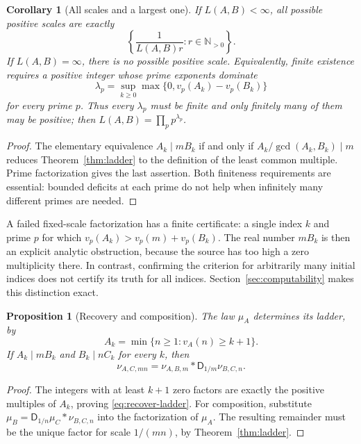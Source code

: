 \documentclass[11pt,a4paper]{article}
\newtheorem{proposition}[theorem]{Proposition}
\newtheorem{corollary}[theorem]{Corollary}
\theoremstyle{definition}
\theoremstyle{remark}
\newcommand{\N}{\mathbb N}
\newcommand{\D}{\mathsf D}
\begin{document}
\begin{corollary}[All scales and a largest one]\label{cor:lcm}
If $L(A,B)<\infty$, all possible positive scales are exactly
\begin{equation}\label{eq:lcm-scales}
 \left\{\frac1{L(A,B)r}:r\in\N_{>0}\right\}.
\end{equation}
If $L(A,B)=\infty$, there is no possible positive scale. Equivalently,
finite existence requires a positive integer whose prime exponents dominate
\begin{equation}\label{eq:prime-deficits}
 \lambda_p=\sup_{k\ge0}\max\{0,v_p(A_k)-v_p(B_k)\}
\end{equation}
for every prime $p$. Thus every $\lambda_p$ must be finite and only finitely
many of them may be positive; then $L(A,B)=\prod_p p^{\lambda_p}$.
\end{corollary}
\begin{proof}
The elementary equivalence $A_k\mid mB_k$ if and only if
$A_k/\gcd(A_k,B_k)\mid m$ reduces Theorem~\ref{thm:ladder} to the definition
of the least common multiple. Prime factorization gives the last assertion.
Both finiteness requirements are essential: bounded deficits at each prime
do not help when infinitely many different primes are needed.
\end{proof}

A failed fixed-scale factorization has a finite certificate: a single index
$k$ and prime $p$ for which $v_p(A_k)>v_p(m)+v_p(B_k)$.
The real number $mB_k$ is then an explicit analytic obstruction, because the
source has too high a zero multiplicity there. In contrast, confirming the
criterion for arbitrarily many initial indices does not certify its truth
for all indices. Section~\ref{sec:computability} makes this distinction exact.

\begin{proposition}[Recovery and composition]\label{prop:composition}
The law $\mu_A$ determines its ladder, by
\begin{equation}\label{eq:recover-ladder}
 A_k=\min\{n\ge1:v_A(n)\ge k+1\}.
\end{equation}
If $A_k\mid mB_k$ and $B_k\mid nC_k$ for every $k$, then
\begin{equation}\label{eq:cocycle}
 \nu_{A,C,mn}=\nu_{A,B,m}*\D_{1/m}\nu_{B,C,n}.
\end{equation}
\end{proposition}
\begin{proof}
The integers with at least $k+1$ zero factors are exactly the positive
multiples of $A_k$, proving \eqref{eq:recover-ladder}. For composition,
substitute $\mu_B=\D_{1/n}\mu_C*\nu_{B,C,n}$ into the factorization of
$\mu_A$. The resulting remainder must be the unique factor for scale
$1/(mn)$, by Theorem~\ref{thm:ladder}.
\end{proof}
\end{document}
